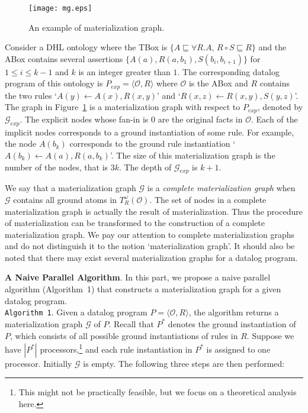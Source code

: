 \documentclass{article}
\begin{document}
\begin{figure}[htbp]
\begin{center}
\texttt{[image: mg.eps]}
\caption{An example of materialization graph.}
\label{fig:mg}
\end{center}
\end{figure}

\begin{example}\label{exp:mg}
Consider a DHL ontology where the TBox is $\{$$A\sqsubseteq\forall R.A$, $R\circ S\sqsubseteq R$$\}$ and the ABox contains several assertions $\{$$A(a),R(a,b_1),S(b_i,b_{i+1})$$\}$ for $1\leq i\leq k-1$ and $k$ is an integer greater than $1$. The corresponding datalog program of this ontology is $P_{exp}=\langle\mathcal{O}, R\rangle$ where $\mathcal{O}$ is the ABox and $R$ contains the two rules `$A(y)\leftarrow A(x),R(x,y)$' and `$R(x,z)\leftarrow R(x,y),S(y,z)$'. The graph in Figure~\ref{fig:mg} is a materialization graph with respect to $P_{exp}$, denoted by $\mathcal{G}_{exp}$. The explicit nodes whose fan-in is 0 are the original facts in $\mathcal{O}$. Each of the implicit nodes corresponds to a ground instantiation of some rule. For example, the node $A(b_k)$ corresponds to the ground rule instantiation `$A(b_k)\leftarrow A(a),R(a,b_k)$'. The size of this materialization graph is the number of the nodes, that is $3k$. The depth of $\mathcal{G}_{exp}$ is $k+1$.
\end{example}

We say that a materialization graph $\mathcal{G}$ is a \emph{complete materialization graph} when $\mathcal{G}$ contains all ground atoms in $T_R^{\omega}(\mathcal{O})$. The set of nodes in a complete materialization graph is actually the result of materialization. Thus the procedure of materialization
can be transformed to the construction of a complete materialization graph. We pay our attention to complete materialization graphs and do not distinguish it to the notion `materialization graph'. It should also be noted that there may exist several materialization graphs for a datalog program.

\textbf{A Naive Parallel Algorithm}. In this part, we propose a naive parallel algorithm (Algorithm~1) that constructs a materialization graph for a given datalog program.\\

\noindent\texttt{Algorithm~1}. Given a datalog program $P=\langle\mathcal{O}, R\rangle$, the algorithm
returns a materialization graph $\mathcal{G}$ of $P$. Recall that $P^*$ denotes the ground instantiation of $P$,
which consists of all possible ground instantiations of rules in $R$. Suppose we have
$|P^*|$ processors,\footnote{This might not be practically feasible, but we focus on a theoretical analysis here.} and each rule instantiation in $P^*$ is assigned to one processor.
Initially $\mathcal{G}$ is empty. The following three steps are then performed:
\end{document}
